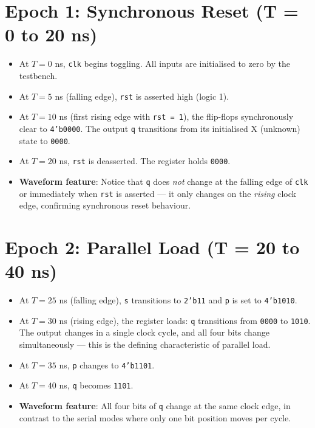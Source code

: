 \documentclass[12pt,a4paper]{report}
\newcommand{\signal}[1]{\texttt{\textcolor{codeblue}{#1}}}
\begin{document}
\section{Epoch 1: Synchronous Reset (T = 0 to 20 ns)}

\begin{itemize}
    \item At $T = 0$ ns, \signal{clk} begins toggling. All inputs are initialised to zero by the testbench.
    \item At $T = 5$ ns (falling edge), \signal{rst} is asserted high (logic 1).
    \item At $T = 10$ ns (first rising edge with \signal{rst = 1}), the flip-flops synchronously clear to \texttt{4'b0000}. The output \signal{q} transitions from its initialised X (unknown) state to \texttt{0000}.
    \item At $T = 20$ ns, \signal{rst} is deasserted. The register holds \texttt{0000}.
    \item \textbf{Waveform feature}: Notice that \signal{q} does \textit{not} change at the falling edge of \signal{clk} or immediately when \signal{rst} is asserted — it only changes on the \textit{rising} clock edge, confirming synchronous reset behaviour.
\end{itemize}

\section{Epoch 2: Parallel Load (T = 20 to 40 ns)}

\begin{itemize}
    \item At $T = 25$ ns (falling edge), \signal{s} transitions to \texttt{2'b11} and \signal{p} is set to \texttt{4'b1010}.
    \item At $T = 30$ ns (rising edge), the register loads: \signal{q} transitions from \texttt{0000} to \texttt{1010}. The output changes in a single clock cycle, and all four bits change simultaneously — this is the defining characteristic of parallel load.
    \item At $T = 35$ ns, \signal{p} changes to \texttt{4'b1101}.
    \item At $T = 40$ ns, \signal{q} becomes \texttt{1101}.
    \item \textbf{Waveform feature}: All four bits of \signal{q} change at the same clock edge, in contrast to the serial modes where only one bit position moves per cycle.
\end{itemize}
\end{document}

